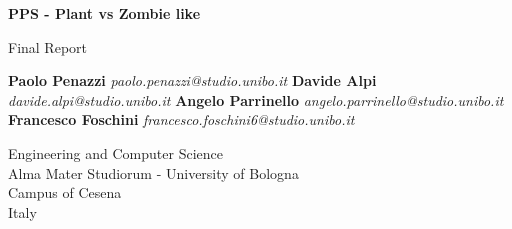
\begin{titlepage}
    \begin{center}
        \vspace*{2cm}

        \huge
        \textbf{PPS - Plant vs Zombie like}

        \vspace{1cm}

        \LARGE
        Final Report

        \vspace{2cm}

        \textbf{Paolo Penazzi}
        \textit{paolo.penazzi@studio.unibo.it}
        \vspace{1cm}
        \textbf{Davide Alpi}
        \textit{davide.alpi@studio.unibo.it}
        \vspace{1cm}
        \textbf{Angelo Parrinello}
        \textit{angelo.parrinello@studio.unibo.it}
        \vspace{1cm}
        \textbf{Francesco Foschini}
        \textit{francesco.foschini6@studio.unibo.it}

        \vspace{4cm}

        \vspace{2cm}

        \Large
        Engineering and Computer Science\\
        Alma Mater Studiorum - University of Bologna\\
        Campus of Cesena\\
        Italy\\

    \end{center}
\end{titlepage}